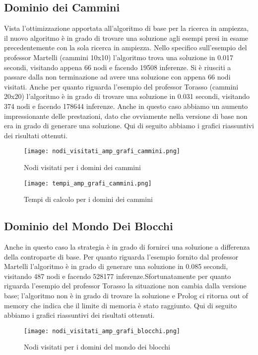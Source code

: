 \subsection{Dominio dei Cammini}
Vista l'ottimizzazione apportata all'algoritmo di base per la ricerca in ampiezza, il nuovo algoritmo è in grado di trovare una soluzione agli esempi presi in esame precedentemente con la sola ricerca in ampiezza. Nello specifico sull'esempio del professor Martelli (cammini 10x10) l'algoritmo trova una soluzione in 0.017 secondi, visitando appena 66 nodi e facendo 19508 inferenze. Si è riusciti a passare dalla non terminazione ad avere una soluzione con appena 66 nodi visitati. Anche per quanto riguarda l'esempio del professor Torasso (cammini 20x20) l'algoritmo è in grado di trovare una soluzione in 0.031 secondi, visitando 374 nodi e facendo 178644 inferenze. Anche in questo caso abbiamo un aumento impressionante delle prestazioni, dato che ovviamente nella versione di base non era in grado di generare una soluzione.
Qui di seguito abbiamo i grafici riassuntivi dei risultati ottenuti.

\begin{figure}[htp]
  \texttt{[image: nodi\_visitati\_amp\_grafi\_cammini.png]}
  \caption{Nodi visitati per i domini dei cammini}
  \label{fig:figure1}
\end{figure}

\begin{figure}[htp]
  \texttt{[image: tempi\_amp\_grafi\_cammini.png]}
  \caption{Tempi di calcolo per i domini dei cammini}
  \label{fig:figure2}
\end{figure}

\subsection{Dominio del Mondo Dei Blocchi}
Anche in questo caso la strategia è in grado di fornirci una soluzione a differenza della controparte di base. Per quanto riguarda l'esempio fornito dal professor Martelli l'algoritmo è in grado di generare una soluzione in 0.085 secondi, visitando 487 nodi e facendo 528177 inferenze.Sfortunatamente per quanto riguarda l'esempio del professor Torasso la situazione non cambia dalla versione base; l'algoritmo non è in grado di trovare la soluzione e Prolog ci ritorna out of memory che indica che il limite di memoria è stato raggiunto.
Qui di seguito abbiamo i grafici riassuntivi dei risultati ottenuti.

\begin{figure}[htp]
  \texttt{[image: nodi\_visitati\_amp\_grafi\_blocchi.png]}
  \caption{Nodi visitati per i domini del mondo dei blocchi}
  \label{fig:figure3}
\end{figure}


